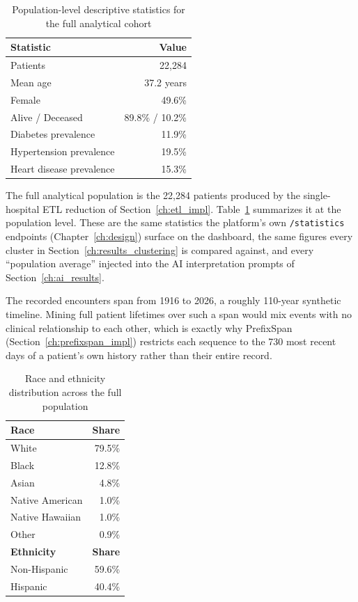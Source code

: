\begin{table}[H]
\centering
\begin{tabular}{lr}
\hline
\textbf{Statistic} & \textbf{Value} \\
\hline
Patients                 & 22{,}284 \\
Mean age                 & 37.2 years \\
Female                   & 49.6\% \\
Alive / Deceased         & 89.8\% / 10.2\% \\
Diabetes prevalence      & 11.9\% \\
Hypertension prevalence  & 19.5\% \\
Heart disease prevalence & 15.3\% \\
\hline
\end{tabular}
\caption{Population-level descriptive statistics for the full analytical cohort}
\label{tab:ch6_dataset_overview}
\end{table}

The full analytical population is the 22{,}284 patients produced by the single-hospital ETL reduction of Section~\ref{ch:etl_impl}. Table~\ref{tab:ch6_dataset_overview} summarizes it at the population level. These are the same statistics the platform's own \texttt{/statistics} endpoints (Chapter~\ref{ch:design}) surface on the dashboard, the same figures every cluster in Section~\ref{ch:results_clustering} is compared against, and every ``population average'' injected into the AI interpretation prompts of Section~\ref{ch:ai_results}.


The recorded encounters span from 1916 to 2026, a roughly 110-year synthetic timeline. Mining full patient lifetimes over such a span would mix events with no clinical relationship to each other, which is exactly why PrefixSpan (Section~\ref{ch:prefixspan_impl}) restricts each sequence to the 730 most recent days of a patient's own history rather than their entire record.

\begin{table}[H]
\centering
\begin{tabular}{lr}
\hline
\textbf{Race} & \textbf{Share} \\
\hline
White            & 79.5\% \\
Black            & 12.8\% \\
Asian            & 4.8\% \\
Native American  & 1.0\% \\
Native Hawaiian  & 1.0\% \\
Other            & 0.9\% \\
\hline
\textbf{Ethnicity} & \textbf{Share} \\
\hline
Non-Hispanic     & 59.6\% \\
Hispanic         & 40.4\% \\
\hline
\end{tabular}
\caption{Race and ethnicity distribution across the full population}
\label{tab:ch6_race_ethnicity}
\end{table}

